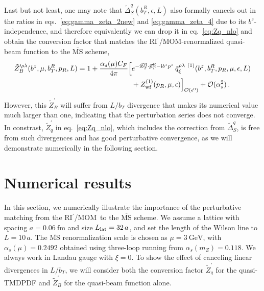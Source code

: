 \documentclass[11pt,a4paper]{article}
\DeclareRobustCommand{\eq}[1]{eq.~\eqref{eq:#1}}
\DeclareRobustCommand{\eqs}[2]{eqs.~\eqref{eq:#1} and \eqref{eq:#2}}
\newcommand{\MS}{{\overline{\mathrm{MS}}}}
\newcommand{\img}{\mathrm{i}}
\newcommand{\eps}{\epsilon}
\newcommand{\cO}{\mathcal{O}}
\newcommand{\nn}{\nonumber}
\newcommand{\as}{\alpha_s}
\newcommand{\fm}{\mathrm{fm}}
\newcommand{\GeV}{\mathrm{GeV}}
\newcommand{\RIpMOM}{RI$^\prime$/MOM}
\begin{document}
Last but not least, one may note that $\tilde\Delta_S^q(b_T^R,\eps,L)$ also formally cancels out in the ratios in \eqs{gamma_zeta_2new}{gamma_zeta_4} due to its $b^z$-independence, and therefore equivalently we can drop it in \eq{Zq_nlo} and obtain the conversion factor that matches the \RIpMOM-renormalized quasi-beam function to the $\MS$ scheme,
\begin{align} \label{eq:ZB_nlo}
 \tilde Z_B^{\prime \rho\lambda}(b^z, \mu, b_T^R, p_R, L)
 = 1 + \frac{\as(\mu) C_F}{4\pi} \Bigl[& e^{-\img \vec b_T^R \cdot \vec p_T^R - \img b^z p^z} \, \tilde q^{\rho\lambda~(1)}_\xi(b^z, b_T^R,p_R,\mu,\eps,L)
 \nn\\&
 + Z_{\rm wf}^{(1)}(p_R,\mu,\eps) \Bigr]_{\cO(\eps^0)} + \cO(\as^2)
\,.\end{align}
However, this $\tilde Z_B^{\prime}$ will suffer from $L/b_T$ divergence that makes its numerical value much larger than one, indicating that the perturbation series does not converge. In constrast, $\tilde Z_q^{\prime}$ in \eq{Zq_nlo}, which includes the correction from $\tilde\Delta_S^q$, is free from such divergences and has good perturbative convergence, as we will demonstrate numerically in the following section.



\section{Numerical results}
\label{sec:numerics}

In this section, we numerically illustrate the importance of the perturbative matching from the \RIpMOM~to the $\MS$ scheme.
We assume a lattice with spacing $a = 0.06~\fm$ and size $L_{\rm lat} = 32\,a$, and set the length of the Wilson line to $L = 10\,a$.
The $\MS$ renormalization scale is chosen as $\mu = 3~\GeV$, with $\as(\mu) = 0.2492$ obtained using three-loop running from $\as(m_Z) = 0.118$. 
We always work in Landau gauge with $\xi=0$.
To show the effect of canceling linear divergences in $L/b_T$, we will consider both the conversion factor $\tilde Z_q^\prime$ for the quasi-TMDPDF and $\tilde Z_B^\prime$ for the quasi-beam function alone.
\end{document}
